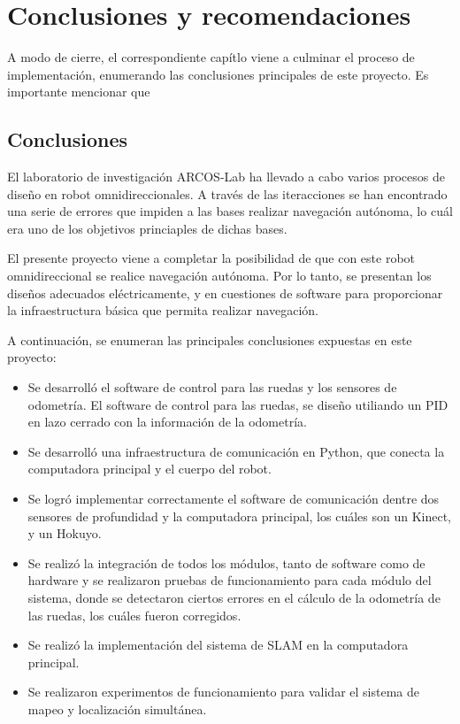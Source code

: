   \chapter{Conclusiones y recomendaciones}
\label{C:conclusiones}

A modo de cierre, el correspondiente capítlo viene a culminar el proceso de implementación, enumerando las conclusiones principales de este proyecto. Es importante mencionar que

\section{Conclusiones}

El laboratorio de investigación ARCOS-Lab ha llevado a cabo varios procesos de diseño en robot omnidireccionales. A través de las iteracciones se han encontrado una serie de errores que impiden a las bases realizar navegación autónoma, lo cuál era uno de los objetivos princiaples de dichas bases.

El presente proyecto viene a completar la posibilidad de que con este robot omnidireccional se realice navegación autónoma. Por lo tanto, se presentan los diseños adecuados eléctricamente, y en cuestiones de software para proporcionar la infraestructura básica que permita realizar navegación.

A continuación, se enumeran las principales conclusiones expuestas en este proyecto:

\begin{itemize}
\item Se desarrolló el software de control para las ruedas y los sensores de odometría. El software de control para las ruedas, se diseño utiliando un PID en lazo cerrado con la información de la odometría.
\item Se desarrolló una infraestructura de comunicación en Python, que conecta la computadora principal y el cuerpo del robot.
\item Se logró implementar correctamente el software de comunicación dentre dos sensores de profundidad y la computadora principal, los cuáles son un Kinect, y un Hokuyo.
\item Se realizó la integración de todos los módulos, tanto de software como de hardware y se realizaron pruebas de funcionamiento para cada módulo del sistema, donde se detectaron ciertos errores en el cálculo de la odometría de las ruedas, los cuáles fueron corregidos.
\item Se realizó la implementación del sistema de SLAM en la computadora principal.
\item Se realizaron experimentos de funcionamiento para validar el sistema de mapeo y localización simultánea.
\end{itemize}

